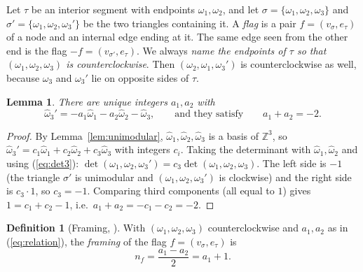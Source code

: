 \documentclass[11pt]{article}
\theoremstyle{plain}
\newtheorem{lemma}[theorem]{Lemma}
\theoremstyle{definition}
\newtheorem{definition}[theorem]{Definition}
\theoremstyle{remark}
\newcommand{\Z}{\mathbb{Z}}
\newcommand{\hatw}{\widehat{\omega}}
\begin{document}
Let $\tau$ be an interior segment with endpoints $\omega_1,\omega_2$, and let
$\sigma=\{\omega_1,\omega_2,\omega_3\}$ and $\sigma'=\{\omega_1,\omega_2,\omega_3'\}$ be the two
triangles containing it. A \textit{flag} is a pair $f=(v_\sigma,e_\tau)$ of a node and an internal
edge ending at it. The same edge seen from the other end is the flag $-f=(v_{\sigma'},e_\tau)$.
We always \textit{name the endpoints of $\tau$ so that $(\omega_1,\omega_2,\omega_3)$ is
counterclockwise}. Then $(\omega_2,\omega_1,\omega_3')$ is counterclockwise as well, because
$\omega_3$ and $\omega_3'$ lie on opposite sides of $\tau$.

\begin{center}
\end{center}

\begin{lemma}\label{lem:a1a2}
There are unique integers $a_1,a_2$ with
\begin{equation}\label{eq:relation}
\hatw_3'=-a_1\hatw_1-a_2\hatw_2-\hatw_3,\qquad\text{and they satisfy}\qquad a_1+a_2=-2 .
\end{equation}
\end{lemma}
\begin{proof}
By Lemma~\ref{lem:unimodular}, $\hatw_1,\hatw_2,\hatw_3$ is a basis of $\Z^3$, so
$\hatw_3'=c_1\hatw_1+c_2\hatw_2+c_3\hatw_3$ with integers $c_i$. Taking the determinant with
$\hatw_1,\hatw_2$ and using (\ref{eq:det3}): $\det(\omega_1,\omega_2,\omega_3')=c_3\det(\omega_1,
\omega_2,\omega_3)$. The left side is $-1$ (the triangle $\sigma'$ is unimodular and
$(\omega_1,\omega_2,\omega_3')$ is clockwise) and the right side is $c_3\cdot1$, so $c_3=-1$.
Comparing third components (all equal to $1$) gives $1=c_1+c_2-1$, i.e.\ $a_1+a_2=-c_1-c_2=-2$.
\end{proof}

\begin{definition}[Framing, {\cite[\S4.2]{Kon}}]\label{def:framing}
With $(\omega_1,\omega_2,\omega_3)$ counterclockwise and $a_1,a_2$ as in (\ref{eq:relation}), the
\textit{framing} of the flag $f=(v_\sigma,e_\tau)$ is
\begin{equation}\label{eq:framing}
n_f=\frac{a_1-a_2}{2}=a_1+1 .
\end{equation}
\end{definition}
\end{document}
